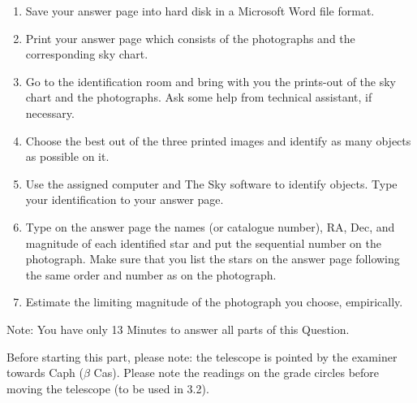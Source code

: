\begin{enumerate}
  buttons from the keyboard, respectively.
\item Save your answer page into hard disk in a Microsoft Word file format.
\item Print your answer page which consists of the photographs and the
  corresponding sky chart.
\item Go to the identification room and bring with you the prints-out of the
  sky chart and the photographs. Ask some help from technical assistant, if
  necessary.
\item Choose the best out of the three printed images and identify as many
  objects as possible on it.
\item Use the assigned computer and The Sky software to identify objects.
  Type your identification to your answer page.
\item Type on the answer page the names (or catalogue number), RA, Dec, and
  magnitude of each identified star and put the sequential number on the
  photograph. Make sure that you list the stars on the answer page following
  the same order and number as on the photograph.
\item Estimate the limiting magnitude of the photograph you choose,
  empirically.
\end{enumerate}

Note: You have only 13 Minutes to answer all parts of this Question.

Before starting this part, please note: the telescope is pointed by the
examiner towards Caph ($\beta$ Cas). Please note the readings on the grade
circles before moving the telescope (to be used in 3.2).

